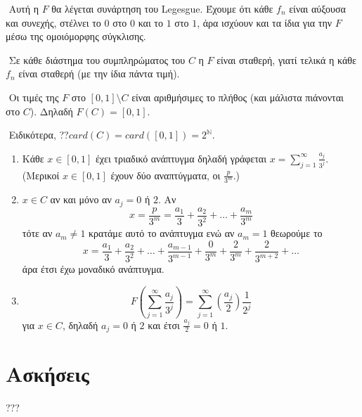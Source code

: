 $ $\newline
Αυτή η $F$ θα λέγεται συνάρτηση του {\eng Legesgue}. Έχουμε ότι κάθε $f_n$ είναι αύξουσα και συνεχής, στέλνει το $0$ στο $0$ και το $1$ στο $1$, άρα ισχύουν και τα ίδια για την $F$ μέσω της ομοιόμορφης σύγκλισης.

$ $\newline
Σε κάθε διάστημα του συμπληρώματος του $C$ η $F$ είναι σταθερή, γιατί τελικά η κάθε $f_n$ είναι σταθερή (με την ίδια πάντα τιμή).

$ $\newline
Οι τιμές της $F$ στο $[0,1]\setminus C$ είναι αριθμήσιμες το πλήθος (και μάλιστα πιάνονται στο $C$). Δηλαδή $F(C) = [0,1]$.

$ $\newline
Ειδικότερα, ??$card(C) = card([0,1]) = 2^{\mathbb{N}}$.


\begin{enumerate} 
    \item Κάθε $x \in [0,1]$ έχει τριαδικό ανάπτυγμα δηλαδή γράφεται $x = \sum\limits_{j=1}^{\infty} \frac{a_j}{3^j}$. (Μερικοί $x \in [0,1]$ έχουν δύο αναπτύγματα, οι $\frac{p}{3^m}$.) 
    \item  $x \in C$ αν και μόνο αν $a_j = 0$ ή $2$. Αν
    $$ x = \frac{p}{3^m} = \frac{a_1}{3} + \frac{a_2}{3^2} + \ldots + \frac{a_m}{3^m{}}$$ τότε αν $a_m \neq 1$ κρατάμε αυτό το ανάπτυγμα ενώ αν $a_m = 1$ θεωρούμε το
    $$x = \frac{a_1}{3} + \frac{a_2}{3^2} + \ldots + \frac{a_{m-1}}{3^{m-1}} + \frac{0}{3^m} + \frac{2}{3^m} + \frac{2}{3^{m+2}} + \ldots $$
    άρα έτσι έχω μοναδικό ανάπτυγμα.

    \item 
    $$F\left(\sum\limits_{j=1}^{\infty} \frac{a_j}{3^j}\right) = \sum\limits_{j=1}^{\infty} \left(\frac{a_j}{2}\right) \frac{1}{2^j}$$ για $x \in C$, δηλαδή $a_j = 0$ ή $2$ και έτσι $\frac{a_j}{2} = 0$ ή $1$.
\end{enumerate}

\pagebreak
\section*{Ασκήσεις}
???

